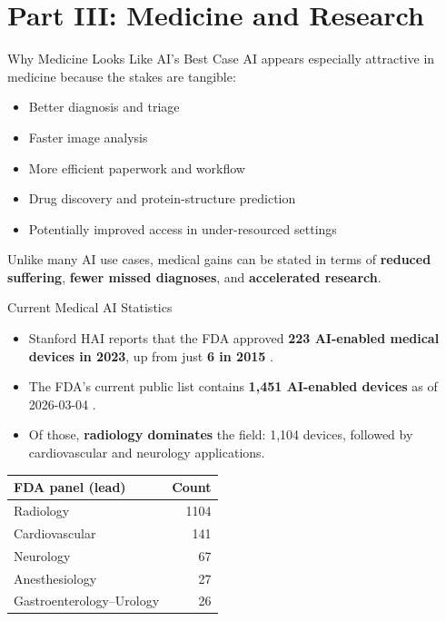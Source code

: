 \documentclass[aspectratio=169,11pt]{beamer}
\begin{document}
\section{Part III: Medicine and Research}

\begin{frame}{Why Medicine Looks Like AI's Best Case}
AI appears especially attractive in medicine because the stakes are tangible:
\begin{itemize}
    \item Better diagnosis and triage
    \item Faster image analysis
    \item More efficient paperwork and workflow
    \item Drug discovery and protein-structure prediction
    \item Potentially improved access in under-resourced settings
\end{itemize}

\vspace{0.2cm}
Unlike many AI use cases, medical gains can be stated in terms of \textbf{reduced suffering}, \textbf{fewer missed diagnoses}, and \textbf{accelerated research}.
\end{frame}

\begin{frame}{Current Medical AI Statistics}
\begin{itemize}
    \item Stanford HAI reports that the FDA approved \textbf{223 AI-enabled medical devices in 2023}, up from just \textbf{6 in 2015} \parencite{stanford_ai_index_2025}.
    \item The FDA's current public list contains \textbf{1,451 AI-enabled devices} as of 2026-03-04 \parencite{fda_ai_medical_devices_2026}.
    \item Of those, \textbf{radiology dominates} the field: 1,104 devices, followed by cardiovascular and neurology applications.
\end{itemize}

\begin{table}[h]
\centering
\scriptsize
\begin{tabular}{@{}lr@{}}
\toprule
\textbf{FDA panel (lead)} & \textbf{Count} \\
\midrule
Radiology & 1104 \\
Cardiovascular & 141 \\
Neurology & 67 \\
Anesthesiology & 27 \\
Gastroenterology--Urology & 26 \\
\bottomrule
\end{tabular}
\end{table}
\end{frame}
\end{document}
